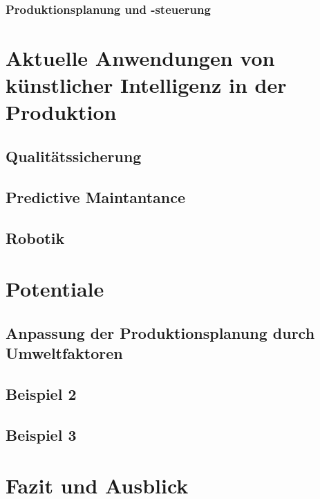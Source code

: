 \documentclass[a4paper,12pt, german]{report}
\begin{document}
\subsection{Produktionsplanung und -steuerung}



\chapter{Aktuelle Anwendungen von künstlicher Intelligenz in der Produktion}






\section{Qualitätssicherung}

\section{Predictive Maintantance}


\section{Robotik}



\chapter{Potentiale}









\section{Anpassung der Produktionsplanung durch Umweltfaktoren}

\section{Beispiel 2}

\section{Beispiel 3}


\chapter{Fazit und Ausblick}

\listoffigures

\clearpage




\appendix
\end{document}
